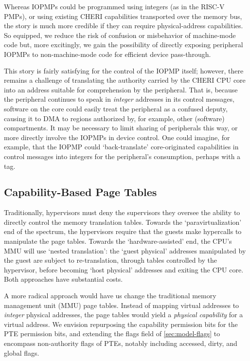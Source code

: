 Whereas IOPMPs could be programmed using integers (as in the RISC-V PMPs), or
using existing CHERI capabilities transported over the memory bus, the story
is much more credible if they can require physical-address capabilities.  So
equipped, we reduce the risk of confusion or misbehavior of machine-mode
code but, more excitingly, we gain the possibility of directly exposing
peripheral IOPMPs to non-machine-mode code for efficient device
pass-through.

This story is fairly satisfying for the control of the IOPMP itself;
however, there remains a challenge of translating the authority carried by
the CHERI CPU core into an address suitable for comprehension by the
peripheral.  That is, because the peripheral continues to speak in
\emph{integer} addresses in its control messages, software on the core could
easily treat the peripheral as a confused deputy, causing it to DMA to
regions authorized by, for example, other (software) compartments.  It may
be necessary to limit sharing of peripherals this way, or more directly
involve the IOPMPs in device control.  One could imagine, for example, that
the IOPMP could `back-translate' core-originated capabilities in control
messages into integers for the peripheral's consumption, perhaps with a tag.

\subsection{Capability-Based Page Tables} %
\label{app:exp:physcap:ptw}

Traditionally, hypervisors must deny the supervisors they oversee the
ability to directly control the memory translation tables.  Towards the
`paravirtualization' end of the spectrum, the hypervisors require that the
guests make hypercalls to manipulate the page tables.  Towards the
`hardware-assisted' end, the CPU's MMU will use `nested translation':
the `guest physical' addresses manipulated by the guest are subject to
re-translation, through tables controlled by the hypervisor, before becoming
`host physical' addresses and exiting the CPU core.  Both approaches have
substantial costs.

A more radical approach would have us change the traditional memory
management unit (MMU) page tables.  Instead of mapping virtual
addresses to \emph{integer} physical addresses, the page tables would yield
a \emph{physical capability} for a virtual address.  We envision repurposing
the capability permission bits for the PTE permission bits, and extending the
flags field of \cref{sec:model-flags} to encompass non-authority flags
of PTEs, notably including accessed, dirty, and global flags.

